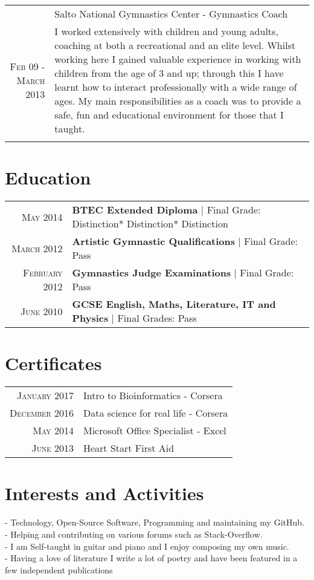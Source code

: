 \documentclass[a4paper,10pt]{article}
\begin{document}
\begin{longtable}{r|p{11cm}}
  &Salto National Gymnastics Center - Gymnastics Coach \\\textsc{Feb 09 - March 2013}&\footnotesize{I worked extensively with children and young adults, coaching at both a recreational and an elite level. Whilst working here I gained valuable experience in working with children from the age of 3 and up; through this I have learnt how to interact professionally with a wide range of ages. My main responsibilities as a coach was to provide a safe, fun and educational environment for those that I taught.}\\\multicolumn{2}{c}{} \\
\end{longtable}

\section{Education}
\begin{tabular}{rl}	
  \textsc{May} 2014& \textbf{BTEC Extended Diploma} | Final Grade: Distinction* Distinction* Distinction
  \\
  \textsc{March} 2012& \textbf{Artistic Gymnastic Qualifications} | Final Grade: Pass
  \\
  \textsc{February} 2012& \textbf{Gymnastics Judge Examinations} | Final Grade: Pass
  \\
  \textsc{June} 2010& \textbf{GCSE English, Maths, Literature, IT and Physics} | Final Grades: Pass
\end{tabular}


\section{Certificates}
\begin{tabular}{rl}
  \textsc{January} 2017 & Intro to Bioinformatics  - Corsera \\
  \textsc{December} 2016 & Data science for real life - Corsera \\
  \textsc{May} 2014 & Microsoft Office Specialist - Excel\\
  \textsc{June} 2013 & Heart Start First Aid 
\end{tabular}


\section{Interests and Activities}
- Technology, Open-Source Software, Programming and 
maintaining my GitHub.\\
- Helping and contributing on various forums such as Stack-Overflow.\\
- I am Self-taught in guitar and piano and I enjoy composing my own music.\\
- Having a love of literature I write a lot of poetry and have been featured in a few independent  publications 
\end{document}
